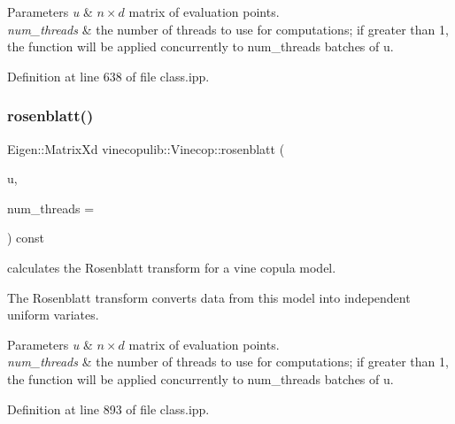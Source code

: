 \begin{DoxyParams}{Parameters}
{\em u} & $ n \times d $ matrix of evaluation points. \\
\hline
{\em num\+\_\+threads} & the number of threads to use for computations; if greater than 1, the function will be applied concurrently to {\ttfamily num\+\_\+threads} batches of {\ttfamily u}. \\
\hline
\end{DoxyParams}


Definition at line 638 of file class.\+ipp.

\mbox{\label{classvinecopulib_1_1_vinecop_a9df88fb9bcdcc420b0771a96943c7d45}} 
\subsubsection{\texorpdfstring{rosenblatt()}{rosenblatt()}}
{\footnotesize\ttfamily Eigen\+::\+Matrix\+Xd vinecopulib\+::\+Vinecop\+::rosenblatt (\begin{DoxyParamCaption}\item[{const Eigen\+::\+Matrix\+Xd \&}]{u,  }\item[{const size\+\_\+t}]{num\+\_\+threads = {} }\end{DoxyParamCaption}) const\hspace{0.3cm}{\ttfamily [inline]}}



calculates the Rosenblatt transform for a vine copula model. 

The Rosenblatt transform converts data from this model into independent uniform variates.


\begin{DoxyParams}{Parameters}
{\em u} & $ n \times d $ matrix of evaluation points. \\
\hline
{\em num\+\_\+threads} & the number of threads to use for computations; if greater than 1, the function will be applied concurrently to {\ttfamily num\+\_\+threads} batches of {\ttfamily u}. \\
\hline
\end{DoxyParams}


Definition at line 893 of file class.\+ipp.

\mbox{\label{classvinecopulib_1_1_vinecop_a0d2fae568f3d893c1c144a8034fbaf90}} 
